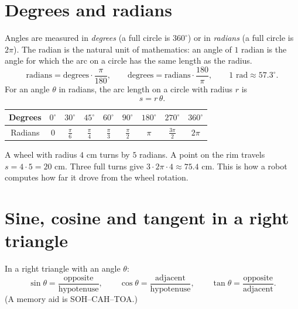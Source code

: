 \label{ch:trig}

\section*{Degrees and radians}
Angles are measured in \emph{degrees} (a full circle is $360^\circ$) or in \emph{radians} (a full circle is $2\pi$). The radian is the natural unit of mathematics: an angle of $1$ radian is the angle for which the arc on a circle has the same length as the radius.
\[
\text{radians}=\text{degrees}\cdot\frac{\pi}{180},\qquad
\text{degrees}=\text{radians}\cdot\frac{180}{\pi},\qquad
1\text{ rad}\approx57.3^\circ.
\]
For an angle $\theta$ in radians, the arc length on a circle with radius $r$ is
\[
s=r\,\theta.
\]

\begin{center}

\label{fig:b2_3}
\end{center}

\begin{center}
\renewcommand{\arraystretch}{1.4}
\begin{tabular}{c|cccccccc}
Degrees & $0^\circ$ & $30^\circ$ & $45^\circ$ & $60^\circ$ & $90^\circ$ & $180^\circ$ & $270^\circ$ & $360^\circ$\\\hline
Radians & $0$ & $\frac\pi6$ & $\frac\pi4$ & $\frac\pi3$ & $\frac\pi2$ & $\pi$ & $\frac{3\pi}{2}$ & $2\pi$
\end{tabular}
\end{center}

\begin{example}[Wheel]
A wheel with radius $4$ cm turns by $5$ radians. A point on the rim travels $s=4\cdot5=20$ cm. Three full turns give $3\cdot2\pi\cdot4\approx75.4$ cm. This is how a robot computes how far it drove from the wheel rotation.
\end{example}

\section*{Sine, cosine and tangent in a right triangle}
In a right triangle with an angle $\theta$:
\[
\sin\theta=\frac{\text{opposite}}{\text{hypotenuse}},\qquad
\cos\theta=\frac{\text{adjacent}}{\text{hypotenuse}},\qquad
\tan\theta=\frac{\text{opposite}}{\text{adjacent}}.
\]
(A memory aid is SOH--CAH--TOA.)

